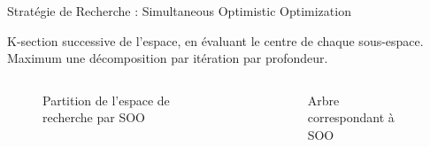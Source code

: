 \begin{frame}{Stratégie de Recherche : Simultaneous Optimistic Optimization}

    \vspace*{-8pt}
    \begin{block}{}
        K-section successive de l'espace, en évaluant le centre de chaque sous-espace. Maximum une décomposition par itération par profondeur.
    \end{block}

    \vspace*{-14pt}
    \begin{columns}
        
        \begin{column}[t]{0.5\textwidth} 
            \begin{figure}
                \centering
                
                \vspace*{-1pt}
                \caption{Partition de l'espace de recherche par SOO}
            \end{figure} 
     
            \end{column}
                 
            \begin{column}[t]{0.5\textwidth}
                \begin{figure}
                    \centering
                    
                    \vspace*{-3pt}
                    \caption{Arbre correspondant à SOO}
                \end{figure} 
            \end{column}
                 
    \end{columns}

\end{frame}

